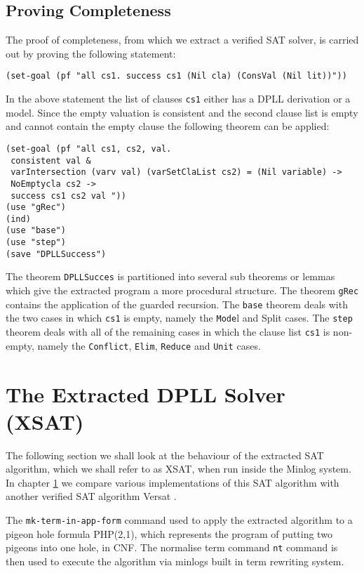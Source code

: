 \subsection*{Proving Completeness}
The proof of completeness, from which we extract a verified SAT solver, is carried out by proving the following statement:

\begin{center}
\texttt{(set-goal (pf "all cs1. success cs1 (Nil cla) (ConsVal (Nil lit))"))}
\end{center}

In the above statement the list of clauses \texttt{cs1} either has a DPLL derivation or a model. Since the empty valuation is consistent and the second clause list is empty and cannot contain the empty clause the following theorem can be applied:


\begin{lstlisting}
(set-goal (pf "all cs1, cs2, val.  
 consistent val & 
 varIntersection (varv val) (varSetClaList cs2) = (Nil variable) -> 
 NoEmptycla cs2 ->  
 success cs1 cs2 val "))
(use "gRec")
(ind)
(use "base")
(use "step")
(save "DPLLSuccess")
\end{lstlisting}

The theorem \texttt{DPLLSucces} is partitioned into several sub theorems or lemmas which give the extracted program a more procedural structure. The theorem \texttt{gRec} contains the application of the guarded recursion.  The \texttt{base} theorem deals with the two cases in which \texttt{cs1} is empty, namely the \texttt{Mode}l and Split cases. The \texttt{step} theorem deals with all of the remaining cases in which the clause list \texttt{cs1} is non-empty, namely the \texttt{Conflict}, \texttt{Elim}, \texttt{Reduce} and \texttt{Unit} cases.


\section{The Extracted DPLL Solver (XSAT)}
The following section we shall look at the behaviour of the extracted SAT algorithm, which we shall refer to as XSAT, when run inside the Minlog system. In chapter \ref{} we compare various implementations of this SAT algorithm with another verified SAT algorithm Versat \cite{}.

The \texttt{mk-term-in-app-form} command used to apply the extracted algorithm to a pigeon hole formula PHP(2,1), which represents the program of putting two pigeons into one hole, in CNF. The normalise term command \texttt{nt} command is then used to execute the algorithm via minlogs built in term rewriting system.

